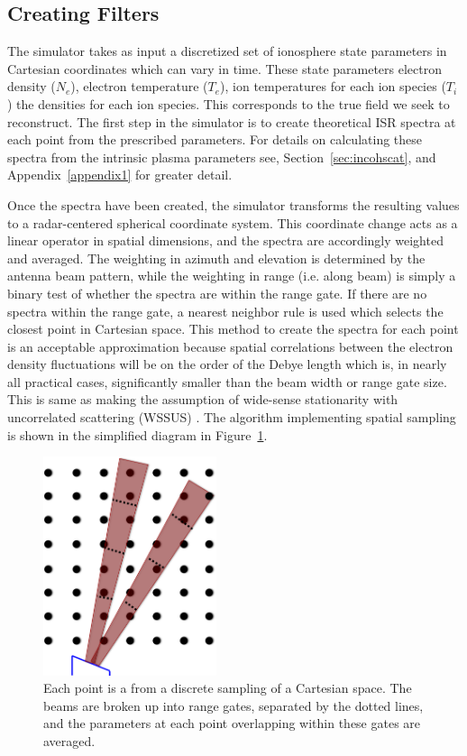 \subsection{Creating Filters}

The simulator takes as input a discretized set of ionosphere state parameters in Cartesian coordinates which can vary in time. These state parameters electron density ($N_e$), electron temperature ($T_e$), ion temperatures for each ion species ($T_i$) the densities for each ion species. This corresponds to the true field we seek to reconstruct. The first step in the simulator is to create theoretical ISR spectra at each point from the prescribed parameters. For details on calculating these spectra from the intrinsic plasma parameters see, Section~\ref{sec:incohscat}, and Appendix~\ref{appendix1} for greater detail. 

Once the spectra have been created, the simulator transforms the resulting values to a radar-centered spherical coordinate system. This coordinate change acts as a linear operator in spatial dimensions, and the spectra are accordingly weighted and averaged. The weighting in azimuth and elevation is determined by the antenna beam pattern, while the weighting in range (i.e. along beam) is simply a binary test of whether the spectra are within the range gate. If there are no spectra within the range gate, a nearest neighbor rule is used which selects the closest point in Cartesian space. This method to create the spectra for each point is an acceptable approximation because spatial correlations between the electron density fluctuations will be on the order of the Debye length \citep{farley1969} which is, in nearly all practical cases, significantly smaller than the beam width or range gate size. This is same as making the assumption of wide-sense stationarity with uncorrelated scattering (WSSUS) \citep{Kailath:1962jx}. The algorithm implementing spatial sampling is shown in the simplified diagram in Figure~\ref{fig:beamdia}.

\begin{figure}[!t]
\centering
\includegraphics[width=2in]{beamsampling}
\caption{Each point is a from a discrete sampling of a Cartesian space. The beams are broken up into range gates, separated by the dotted lines, and the parameters at each point overlapping within these gates are averaged.}
\label{fig:beamdia}
\end{figure}
 
